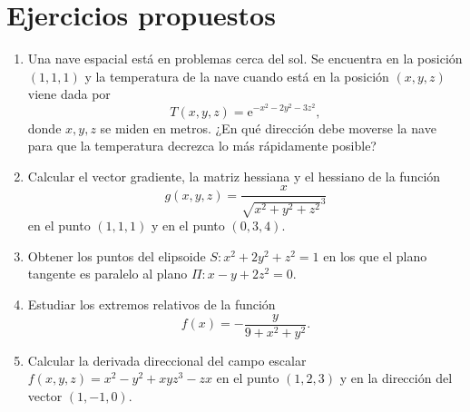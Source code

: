 \section{Ejercicios propuestos}
\begin{enumerate}[leftmargin=*]
\item Una nave espacial está en problemas cerca del sol. 
Se encuentra en la posición $(1,1,1)$ y la temperatura de la nave cuando está en la posición $(x,y,z)$ viene dada por
\[T(x,y,z)=\mbox{e}^{-x^2-2y^2-3z^2},\]
donde $x,y,z$ se miden en metros.
¿En qué dirección debe moverse la nave para que la temperatura decrezca lo más rápidamente posible?

\item Calcular el vector gradiente, la matriz hessiana y el hessiano de la función
\[
g(x,y,z) = \frac{x}{\sqrt{x^2+y^2+z^2}^3}
\]
en el punto $(1,1,1)$ y en el punto $(0,3,4)$. 

\item Obtener los puntos del elipsoide $S: x^2+2y^2+z^2=1$ en los que el plano tangente es paralelo al plano $\Pi:
x-y+2z^2=0$.

\item Estudiar los extremos relativos de la función 
\[
f(x)=-\frac{y}{9+x^2+y^2}.
\]

\item Calcular la derivada direccional del campo escalar $f(x,y,z)=x^2-y^2+xyz^3-zx$ en el punto $(1,2,3)$ y en la
dirección del vector $(1,-1,0)$.
\end{enumerate}
